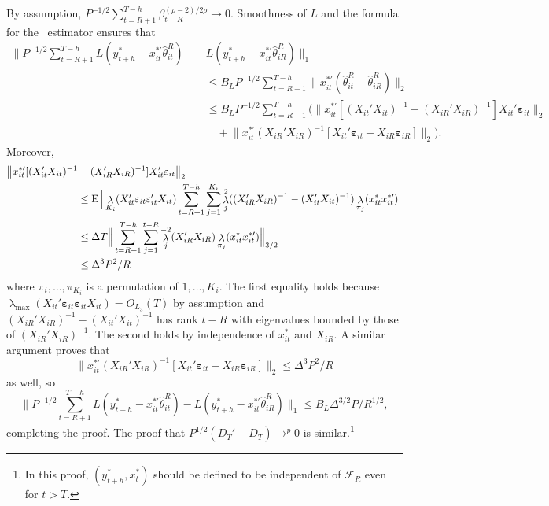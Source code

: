 \documentclass[11pt]{article}
\newcommand{\e}{\varepsilon}
\newcommand{\eb}{\mathbf{\e}}
\DeclareMathOperator{\eigen}{\lambda}
\begin{document}
By assumption, $P^{-1/2} \sum_{t=R+1}^{T-h}
\beta_{t-R}^{(\rho-2)/2\rho} \to 0$.  Smoothness of $L$ and the
formula for the \ols\ estimator ensures that
\begin{align*}
  \Big\|P^{-1/2} \sum_{t=R+1}^{T-h} L(y_{t+h}^{*} - x_{it}^{*\prime}
  \hat{\theta}_{it}^R) - & L(y_{t+h}^{*} - x_{it}^{*\prime}
  \hat{\theta}_{iR}^R)\Big\|_1 \\ &\leq B_{L} P^{-1/2}
  \sum_{t=R+1}^{T-h} \| x_{it}^{*\prime} (\hat{\theta}_{it}^R -
  \hat{\theta}_{iR}^R) \|_2 \\ &\leq B_{L} P^{-1/2} \sum_{t=R+1}^{T-h}
  \Big(\big\| x_{it}^{*\prime} [(X_{it}'X_{it})^{-1} -
  (X_{iR}'X_{iR})^{-1}] X_{it}' \eb_{it} \big\|_2 \\
  &\quad + \big\| x_{it}^{*\prime}
  (X_{iR}'X_{iR})^{-1}[X_{it}'\eb_{it} - X_{iR}
  \eb_{iR} ] \big\|_2 \Big).
\end{align*}
  Moreover,
\begin{align*}
  \big\| x_{it}^{*\prime} [(X_{it}'X_{it})^{-1} &-
  (X_{iR}'X_{iR})^{-1}] X_{it}' \eb_{it} \big\|_2 \\
  &\leq \E \Big| \eigen_{K_i}(X_{it}' \eb_{it}
  \eb_{it}' X_{it})\sum_{t=R+1}^{T-h}
  \sum_{j=1}^{K_i} \eigen_j^2((X_{iR}'X_{iR})^{-1} -
  (X_{it}'X_{it})^{-1}) \eigen_{\pi_j}(x_{it}^{*} x_{it}^{*\prime})
  \Big| \\ &\leq \Delta T \Big\| \sum_{t=R+1}^{T-h} \sum_{j=1}^{t-R}
  \eigen_j^{-2}(X_{iR}'X_{iR}) \eigen_{\pi_j}(x_{it}^{*}
  x_{it}^{*\prime}) \Big\|_{3/2} \\ &\leq \Delta^3 P^2/R
\end{align*}
where $\pi_i,\dots,\pi_{K_i}$ is a permutation of $1,\dots,K_i$.  The
first equality holds because $\eigen_{\max}(X_{it}'
\eb_{it} \eb_{it} X_{it}) =
O_{L_{3}}(T)$ by assumption and $(X_{iR}'X_{iR})^{-1} -
(X_{it}'X_{it})^{-1}$ has rank $t-R$ with eigenvalues bounded by those
of $(X_{iR}'X_{iR})^{-1}$.  The second holds by independence of
$x_{it}^{*}$ and $X_{iR}$.  A similar argument proves that
\begin{equation*}
  \big\| x_{it}^{*\prime}
  (X_{iR}'X_{iR})^{-1}[X_{it}'\eb_{it} - X_{iR}
  \eb_{iR} ] \big\|_2 \leq \Delta^3 P^2/R
\end{equation*}
as well, so 
\begin{equation*}
  \Big\|P^{-1/2} \sum_{t=R+1}^{T-h} L(y_{t+h}^{*} - x_{it}^{*\prime}
  \hat{\theta}_{it}^R) -  L(y_{t+h}^{*} - x_{it}^{*\prime}
  \hat{\theta}_{iR}^R)\Big\|_1 \leq B_L \Delta^{3/2} P / R^{1/2},
\end{equation*}
completing the proof. The proof that $P^{1/2} (\bar{D}_T' - \bar{D}_T)
\to^p 0$ is similar.\footnote{In this proof, $(y_{t+h}^{*}, x_t^{*})$
  should be defined to be independent of $\mathcal{F}_R$ even for $t >
  T$.}
\end{document}

